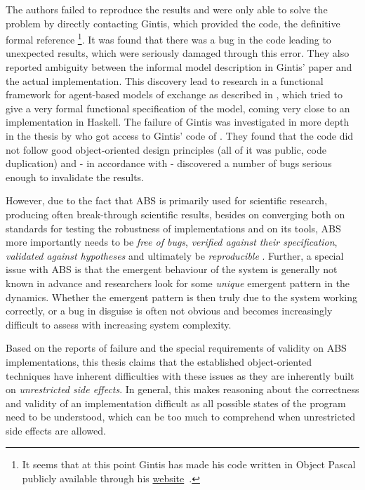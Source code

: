 The authors \cite{ionescu_dependently-typed_2012} failed to reproduce the results and were only able to solve the problem by directly contacting Gintis, which provided the code, the definitive formal reference \footnote{It seems that at this point Gintis has made his code written in Object Pascal publicly available through his \href{https://people.umass.edu/gintis/}{website}~\cite{gintis_herbert_website}.}. It was found that there was a bug in the code leading to unexpected results, which were seriously damaged through this error. They also reported ambiguity between the informal model description in Gintis' paper and the actual implementation.
This discovery lead to research in a functional framework for agent-based models of exchange as described in \cite{botta_functional_2011}, which tried to give a very formal functional specification of the model, coming very close to an implementation in Haskell. The failure of Gintis was investigated in more depth in the thesis by \cite{evensen_extensible_2010} who got access to Gintis' code of \cite{gintis_emergence_2006}. They found that the code did not follow good object-oriented design principles (all of it was public, code duplication) and - in accordance with \cite{ionescu_dependently-typed_2012} - discovered a number of bugs serious enough to invalidate the results.

\medskip

However, due to the fact that ABS is primarily used for scientific research, producing often break-through scientific results, besides on converging both on standards for testing the robustness of implementations and on its tools, ABS more importantly needs to be \textit{free of bugs}, \textit{verified against their specification}, \textit{validated against hypotheses} and ultimately be \textit{reproducible} \cite{axelrod_chapter_2006}. Further, a special issue with ABS is that the emergent behaviour of the system is generally not known in advance and researchers look for some \textit{unique} emergent pattern in the dynamics. Whether the emergent pattern is then truly due to the system working correctly, or a bug in disguise is often not obvious and becomes increasingly difficult to assess with increasing system complexity. 

Based on the reports of failure and the special requirements of validity on ABS implementations, this thesis claims that the established object-oriented techniques have inherent difficulties with these issues as they are inherently built on \textit{unrestricted side effects}. In general, this makes reasoning about the correctness and validity of an implementation difficult as all possible states of the program need to be understood, which can be too much to comprehend when unrestricted side effects are allowed.

